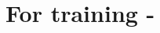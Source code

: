 \documentclass[main.tex]{article}
\begin{document}
\newpage
\appendix \label{appendix}

\section{For training - }
% 
\end{document}
